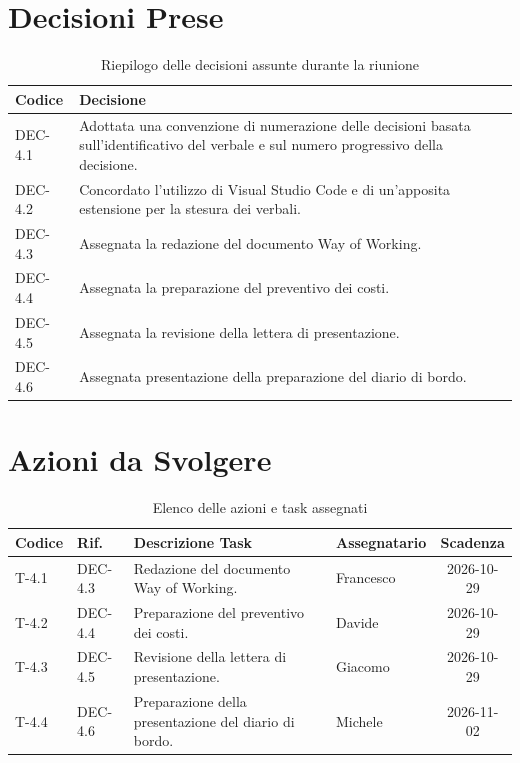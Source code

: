 \documentclass[11pt, a4paper]{article}
\begin{document}
\clearpage
\section{Decisioni Prese}

\begin{table}[htbp]
\centering
\caption{Riepilogo delle decisioni assunte durante la riunione}
\label{tab:decisioni}
\begin{tabularx}{\textwidth}{l X}
\toprule
\textbf{Codice} & \textbf{Decisione} \\
\midrule
DEC-4.1 & Adottata una convenzione di numerazione delle decisioni basata sull'identificativo del verbale e sul numero progressivo della decisione. \\
DEC-4.2 & Concordato l'utilizzo di Visual Studio Code e di un'apposita estensione per la stesura dei verbali. \\
DEC-4.3 & Assegnata la redazione del documento Way of Working. \\
DEC-4.4 & Assegnata la preparazione del preventivo dei costi. \\
DEC-4.5 & Assegnata la revisione della lettera di presentazione. \\
DEC-4.6 & Assegnata presentazione della preparazione del diario di bordo. \\

\bottomrule
\end{tabularx}
\end{table}

\section{Azioni da Svolgere}

\begin{table}[htbp]
\centering
\caption{Elenco delle azioni e task assegnati}
\label{tab:azioni}
\begin{tabularx}{\textwidth}{l l X l c}
\toprule
\textbf{Codice} & \textbf{Rif.} & \textbf{Descrizione Task} & \textbf{Assegnatario} & \textbf{Scadenza} \\
\midrule
T-4.1 & DEC-4.3 & Redazione del documento Way of Working. & Francesco & 2026-10-29 \\
T-4.2 & DEC-4.4 & Preparazione del preventivo dei costi. & Davide & 2026-10-29 \\
T-4.3 & DEC-4.5 & Revisione della lettera di presentazione. & Giacomo & 2026-10-29 \\
T-4.4 & DEC-4.6 & Preparazione della presentazione del diario di bordo. & Michele & 2026-11-02 \\

\bottomrule
\end{tabularx}
\end{table}
\end{document}
